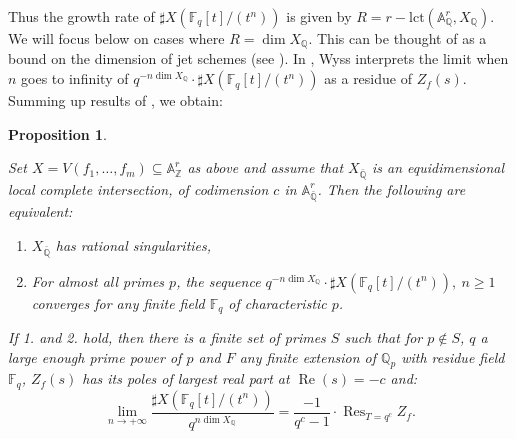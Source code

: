 \documentclass[11pt,english]{article}
\numberwithin{equation}{section}
\numberwithin{figure}{section}
\theoremstyle{definition}
\theoremstyle{plain}
\newtheorem{prop}[df]{Proposition}
\theoremstyle{remark}
\DeclareMathOperator{\Rea}{Re}
\DeclareMathOperator{\Res}{Res}
\newcommand\QQ{\mathbb{Q}}
\begin{document}
Thus the growth rate of $\sharp X(\mathbb{F}_{q}[t]/(t^{n}))$ is
given by $R=r-\mathrm{lct}(\mathbb{A}_{\mathbb{Q}}^{r},X_{\mathbb{Q}})$.
We will focus below on cases where $R=\dim X_{\mathbb{Q}}$. This
can be thought of as a bound on the dimension of jet schemes (see
\cite[Cor. 0.1.]{Mus02}). In \cite{Wys17b}, Wyss interprets the
limit when $n$ goes to infinity of $q^{-n\dim X_{\mathbb{Q}}}\cdot\sharp X(\mathbb{F}_{q}[t]/(t^{n}))$
as a residue of $Z_{f}(s)$. Summing up results of \cite{Wys17b,AA18,Gla19},
we obtain:

\begin{prop} \label{Prop/JetCountLim}

Set $X=V(f_{1},\ldots,f_{m})\subseteq\mathbb{A}_{\mathbb{Z}}^{r}$
as above and assume that $X_{\bar{\QQ}}$ is an equidimensional local
complete intersection, of codimension $c$ in $\mathbb{A}_{\bar{\QQ}}^{r}$.
Then the following are equivalent:
\begin{enumerate}
\item $X_{\bar{\QQ}}$ has rational singularities,
\item For almost all primes $p$, the sequence $q^{-n\dim X_{\mathbb{Q}}}\cdot\sharp X(\mathbb{F}_{q}[t]/(t^{n})),\ n\geq1$
converges for any finite field $\mathbb{F}_{q}$ of characteristic
$p$.
\end{enumerate}
If 1. and 2. hold, then there is a finite set of primes $S$ such
that for $p\notin S$, $q$ a \textit{large enough} prime power of
$p$ and $F$ any finite extension of $\mathbb{Q}_{p}$ with residue
field $\mathbb{F}_{q}$, $Z_{f}(s)$ has its poles of largest real
part at $\Rea(s)=-c$ and:\[
\underset{n\rightarrow +\infty}{\lim}\frac{\sharp X(\mathbb{F}_{q}[t]/(t^{n}))}{q^{n\dim X_{\mathbb{Q}}}}=\frac{-1}{q^c-1}\cdot\Res_{T=q^c}Z_f.
\]

\end{prop}
\end{document}
